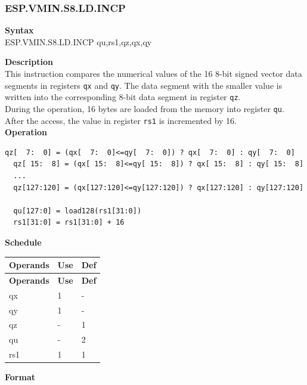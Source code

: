 \newpage
\subsubsection{ESP.VMIN.S8.LD.INCP}\label{instruction:ESPVMINS8LDINCP}
\textbf{Syntax}\\
ESP.VMIN.S8.LD.INCP qu,rs1,qz,qx,qy

\textbf{Description}\\
This instruction compares the numerical values of the 16 8-bit signed vector data segments in registers \lstinline{qx} and \lstinline{qy}. The data segment with the smaller value is written into the corresponding 8-bit data segment in register \lstinline{qz}.\\During the operation, 16 bytes are loaded from the memory into register \lstinline{qu}. After the access, the value in register \lstinline{rs1} is incremented by 16.\\
\textbf{Operation}
\begin{lstlisting}[escapeinside=`?]
  qz[  7:  0] = (qx[  7:  0]<=qy[  7:  0]) ? qx[  7:  0] : qy[  7:  0]
  qz[ 15:  8] = (qx[ 15:  8]<=qy[ 15:  8]) ? qx[ 15:  8] : qy[ 15:  8]
  ...
  qz[127:120] = (qx[127:120]<=qy[127:120]) ? qx[127:120] : qy[127:120]

  qu[127:0] = load128(rs1[31:0])
  rs1[31:0] = rs1[31:0] + 16
\end{lstlisting}


\textbf{Schedule}\\
\begin{longtable}[c]{|l|l|l|}
    \hline
    \rowcolor{lightgray}
    \textbf{Operands} & \textbf{Use} & \textbf{Def} \\\hline
    \endfirsthead
    \hline
    \rowcolor{lightgray}
     \textbf{Operands} & \textbf{Use} & \textbf{Def} \\\hline
    \endhead
    \hline
    \endfoot

    qx & 1 & - \\\hline
  qy & 1 & - \\\hline
     qz & - & 1 \\\hline
     qu & - & 2 \\\hline
     rs1 & 1 & 1

\end{longtable}

\textbf{Format}\\

